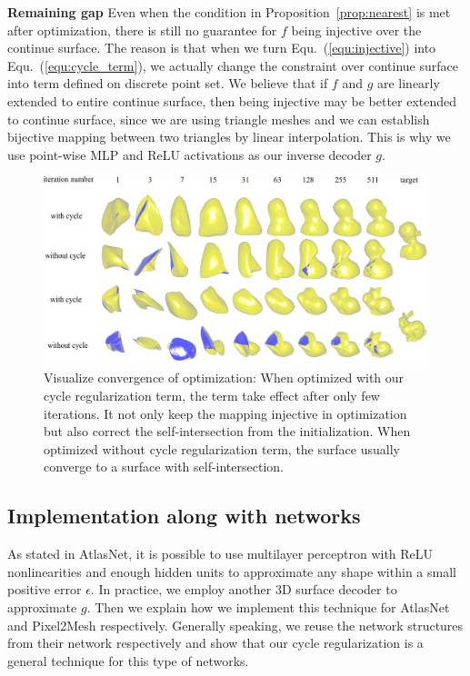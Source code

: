 \noindent\textbf{Remaining gap}
Even when the condition in Proposition~\ref{prop:nearest} is met after optimization, there is still no guarantee for $f$ being injective over the continue surface. The reason is that when we turn Equ.~(\ref{equ:injective}) into Equ.~(\ref{equ:cycle_term}), we actually change the constraint over continue surface into term defined on discrete point set. We believe that if $f$ and $g$ are linearly extended to entire continue surface, then being injective may be better extended to continue surface, since we are using triangle meshes and we can establish bijective mapping between two triangles by linear interpolation. This is why we use point-wise MLP and ReLU activations as our inverse decoder $g$.
\begin{figure}[htbp]
	\centering
	\includegraphics[width=\linewidth]{img/opt/opt}
	\caption{Visualize convergence of optimization: When optimized with our cycle regularization term, the term take effect after only few iterations. It not only keep the mapping injective in optimization but also correct the self-intersection from the initialization. When optimized without cycle regularization term, the surface usually converge to a surface with self-intersection.}
	\label{fig:opt}
\end{figure}


\subsection{Implementation along with networks}

As stated in AtlasNet\cite{atlasnet}, it is possible to use multilayer perceptron with ReLU nonlinearities and enough hidden units to approximate any shape within a small positive error $\epsilon$. In practice, we employ another 3D surface decoder to approximate $g$. Then we explain how we implement this technique for AtlasNet and Pixel2Mesh respectively. Generally speaking, we reuse the network structures from their network respectively and show that our cycle regularization is a general technique for this type of networks.

